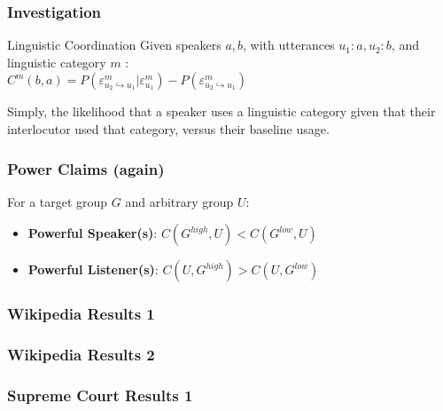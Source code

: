 \documentclass{beamer}
\begin{document}
\begin{frame}
\frametitle{Investigation}
\begin{block}{Linguistic Coordination}
Given speakers $a, b$, with utterances $u_1 : a, u_2 : b$, and linguistic category $m$ : \\
$C^m(b,a) = P(\varepsilon^{m}_{u_2 \hookrightarrow u_1}|\varepsilon^{m}_{u_1}) - P(\varepsilon^{m}_{u_2 \hookrightarrow u_1})$
\end{block}
Simply, the likelihood that a speaker uses a linguistic category given that their interlocutor used that category, versus their baseline usage.
\end{frame}
\begin{frame}
\frametitle{Power Claims (again)}
For a target group $G$ and arbitrary group $U$:\\
\begin{itemize}
	\item \textbf{Powerful Speaker(s)}: $C(G^{high}, U) < C(G^{low}, U)$
	\item \textbf{Powerful Listener(s)}: $C(U, G^{high}) > C(U, G^{low})$
\end{itemize}
\end{frame}
\begin{frame}
\frametitle{Wikipedia Results 1}
\begin{figure}
\end{figure}
\end{frame}
\begin{frame}
\frametitle{Wikipedia Results 2}
\begin{figure}
\end{figure}
\end{frame}
\begin{frame}
\frametitle{Supreme Court Results 1}
\begin{figure}
\end{figure}
\end{frame}
\end{document}

